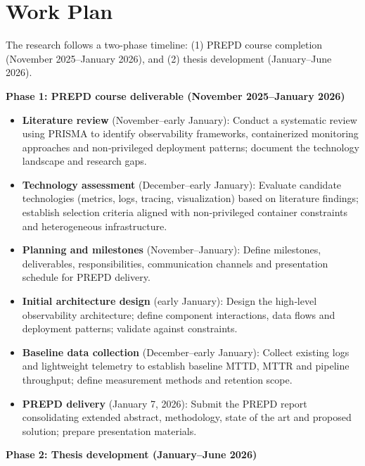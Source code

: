 \documentclass[12pt]{article}
\begin{document}
\section{Work Plan}

The research follows a two-phase timeline: (1) PREPD course completion (November 2025–January 2026), and (2) thesis development (January–June 2026).

\textbf{Phase 1: PREPD course deliverable (November 2025–January 2026)}

\begin{itemize}
    \item \textbf{Literature review} (November–early January): Conduct a systematic review using \ac{PRISMA} to identify observability frameworks, containerized monitoring approaches and non‑privileged deployment patterns; document the technology landscape and research gaps.
    \item \textbf{Technology assessment} (December–early January): Evaluate candidate technologies (metrics, logs, tracing, visualization) based on literature findings; establish selection criteria aligned with non‑privileged container constraints and heterogeneous infrastructure.
    \item \textbf{Planning and milestones} (November–January): Define milestones, deliverables, responsibilities, communication channels and presentation schedule for PREPD delivery.
    \item \textbf{Initial architecture design} (early January): Design the high‑level observability architecture; define component interactions, data flows and deployment patterns; validate against constraints.
    \item \textbf{Baseline data collection} (December–early January): Collect existing logs and lightweight telemetry to establish baseline \ac{MTTD}, \ac{MTTR} and pipeline throughput; define measurement methods and retention scope.
    \item \textbf{PREPD delivery} (January 7, 2026): Submit the PREPD report consolidating extended abstract, methodology, state of the art and proposed solution; prepare presentation materials.
\end{itemize}

\textbf{Phase 2: Thesis development (January–June 2026)}
\end{document}

